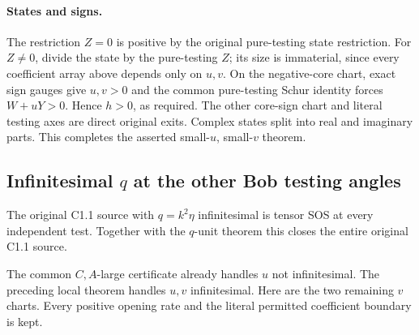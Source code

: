 \paragraph{States and signs.}
The restriction $Z=0$ is positive by the original pure-testing state
restriction. For $Z\ne0$, divide the state by the pure-testing $Z$;
its size is immaterial, since every coefficient array above depends
only on $u,v$. On the negative-core chart, exact sign gauges give
$u,v>0$ and the common pure-testing Schur identity forces
$W+uY>0$. Hence $h>0$, as required. The other core-sign chart and
literal testing axes are direct original exits. Complex states
split into real and imaginary parts. This completes the asserted
small-$u$, small-$v$ theorem.



\subsection{Infinitesimal $q$ at the other Bob testing angles}

\label{component:pd2ecc6ac1891}

\label{pd2ecc6ac1891:sec:r7-c1-q-inf-remote}
\begin{theorem}
The original C1.1 source with $q=k^2\eta$ infinitesimal is tensor SOS
at every independent test. Together with the $q$-unit theorem this
closes the entire original C1.1 source.
\end{theorem}
The common $C,A$-large certificate already handles $u$ not
infinitesimal. The preceding local theorem handles $u,v$
infinitesimal. Here are the two remaining $v$ charts. Every positive
opening rate and the literal permitted coefficient boundary is kept.

